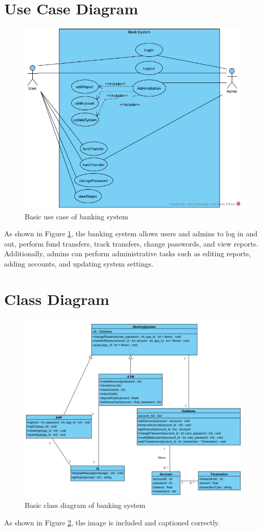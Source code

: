 \documentclass[12pt]{article}
\begin{document}
\newpage 
\section{Use Case Diagram}
\begin{figure}[h]
    \centering
    \includegraphics[width=\linewidth]{WeeklyReport/BankSysUseCase.png}
    \caption{Basic use case of banking system }
    \label{fig:usecase}
\end{figure}

As shown in Figure \ref{fig:usecase}, the banking system allows users and admins to log in and out, perform fund transfers, track transfers, change passwords, and view reports. Additionally, admins can perform administrative tasks such as editing reports, adding accounts, and updating system settings.

\newpage
\section{Class Diagram}

\begin{figure}[h]
    \centering
    \includegraphics[width=\linewidth]{WeeklyReport/class_diagram.png}
    \caption{Basic class diagram of banking system }
    \label{fig:classdiagram}
\end{figure}

As shown in Figure \ref{fig:classdiagram}, the image is included and captioned correctly.
\end{document}
